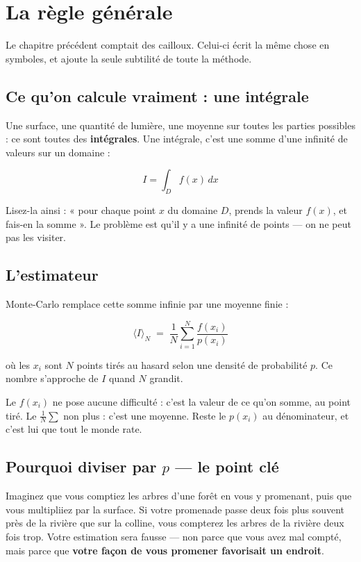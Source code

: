 \chapter{La règle générale}

Le chapitre précédent comptait des cailloux. Celui-ci écrit la même chose en
symboles, et ajoute la seule subtilité de toute la méthode.

\section{Ce qu'on calcule vraiment : une intégrale}

Une surface, une quantité de lumière, une moyenne sur toutes les parties
possibles : ce sont toutes des \textbf{intégrales}. Une intégrale, c'est une
somme d'une infinité de valeurs sur un domaine :

\[ I = \int_{D} f(x)\,dx \]

Lisez-la ainsi : « pour chaque point $x$ du domaine $D$, prends la valeur
$f(x)$, et fais-en la somme ». Le problème est qu'il y a une infinité de
points — on ne peut pas les visiter.

\section{L'estimateur}

Monte-Carlo remplace cette somme infinie par une moyenne finie :

\begin{nkretenir}
\[ \langle I \rangle_N \;=\; \frac{1}{N}\sum_{i=1}^{N} \frac{f(x_i)}{p(x_i)} \]

où les $x_i$ sont $N$ points tirés au hasard selon une densité de probabilité
$p$. Ce nombre s'approche de $I$ quand $N$ grandit.
\end{nkretenir}

Le $f(x_i)$ ne pose aucune difficulté : c'est la valeur de ce qu'on somme, au
point tiré. Le $\frac{1}{N}\sum$ non plus : c'est une moyenne. Reste le
$p(x_i)$ au dénominateur, et c'est lui que tout le monde rate.

\section{Pourquoi diviser par $p$ — le point clé}

Imaginez que vous comptiez les arbres d'une forêt en vous y promenant, puis que
vous multipliiez par la surface. Si votre promenade passe deux fois plus souvent
près de la rivière que sur la colline, vous compterez les arbres de la rivière
deux fois trop. Votre estimation sera fausse — non parce que vous avez mal
compté, mais parce que \textbf{votre façon de vous promener favorisait un
endroit}.

